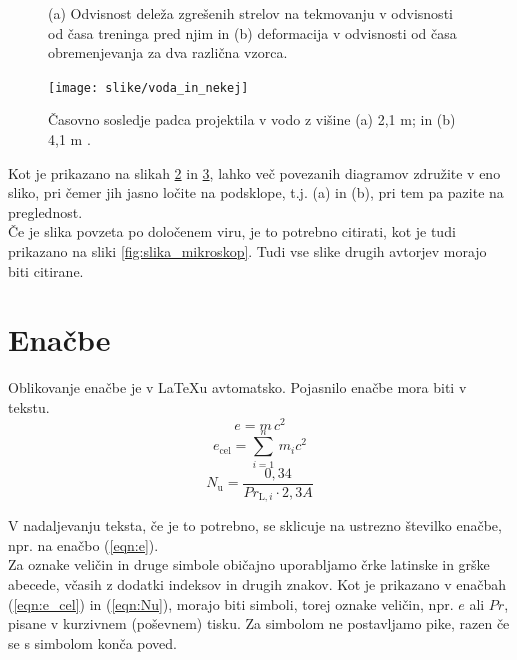 \begin{figure}
\begin{subfigure}[b]{.45\linewidth}
        \caption{}\label{subfig:graf2}
    \end{subfigure}

    \caption{(a) Odvisnost deleža zgrešenih strelov na tekmovanju v odvisnosti od časa treninga pred njim in (b) deformacija v odvisnosti od časa obremenjevanja za dva različna vzorca.}\label{fig:2_grafa}
\end{figure}

\begin{figure}[ht!]
\begin{centering}
  \texttt{[image: slike/voda\_in\_nekej]}
  \caption{Časovno sosledje padca projektila v vodo z višine (a) 2,1 m; in (b) 4,1 m \cite{bazant_1991}.} \label{fig:voda_in_nekej}
\end{centering}
\end{figure}

Kot je prikazano na slikah \ref{fig:2_grafa} in \ref{fig:voda_in_nekej}, lahko več povezanih diagramov združite v eno sliko, pri čemer jih jasno ločite na podsklope, t.j. (a) in (b), pri tem pa pazite na preglednost.\\

Če je slika povzeta po določenem viru, je to potrebno citirati, kot je tudi prikazano na sliki \ref{fig:slika_mikroskop}. Tudi vse slike drugih avtorjev morajo biti citirane.

\section{Enačbe}\label{sec:enacbe}

Oblikovanje enačbe je v \LaTeX u avtomatsko. Pojasnilo enačbe mora biti v tekstu.
\begin{equation}\label{eqn:e}
e = m\,c^2
\end{equation}
\begin{equation}\label{eqn:e_cel}
e_{\text{cel}}=\sum_{i=1}^{n}\,m_{i}c^2
\end{equation}
\begin{equation}\label{eqn:Nu}
N_{\text{u}} = \frac{0{,}34}{Pr_{\text{L},i}\cdot 2{,}3A}
\end{equation}

V nadaljevanju teksta, če je to potrebno, se sklicuje na ustrezno številko enačbe, npr. na enačbo (\ref{eqn:e}).\\

Za oznake veličin in druge simbole običajno uporabljamo črke latinske in grške abecede, včasih z dodatki indeksov in drugih znakov. Kot je prikazano v enačbah (\ref{eqn:e_cel}) in (\ref{eqn:Nu}), morajo biti simboli, torej oznake veličin, npr. $e$ ali $Pr$, pisane v kurzivnem (poševnem) tisku. Za simbolom ne postavljamo pike, razen če se s simbolom konča poved.\\

